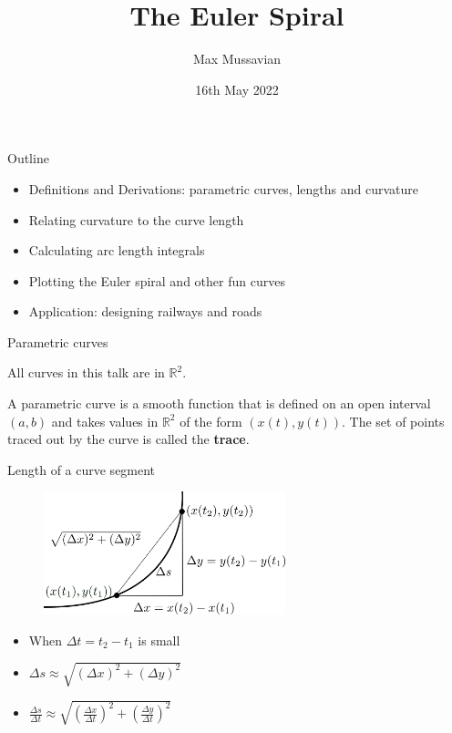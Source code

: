 \documentclass{beamer}
\title{The Euler Spiral}
\author{Max Mussavian}
\date[2022]{16th May 2022}
\begin{document}
\begin{frame}[plain]
    \maketitle
\end{frame}
\begin{frame}{Outline}
	\begin{itemize}
		\item Definitions and Derivations: parametric curves, lengths and curvature
		\item Relating curvature to the curve length
		\item Calculating arc length integrals
		\item Plotting the Euler spiral and other fun curves
		\item Application: designing railways and roads
	\end{itemize}
\end{frame}


\begin{frame}{Parametric curves}
	
		All curves in this talk are in $\mathbb{R}^2$.
		\begin{definition}
			A parametric curve is a smooth function that is defined on an open interval $(a, b)$ and takes values in $\mathbb{R}^2$ of the form $(x(t), y(t))$.
			\newline
			The set of points traced out by the curve is called the \textbf{trace}.
		\end{definition}
\end{frame}

\begin{frame}{Length of a curve segment}
	\begin{figure}
		\centering
		\includegraphics[width=70mm, scale=0.2]{curve_length_2.png}
	\end{figure}
	\begin{itemize}
		\item When $\Delta t = t_2 - t_1$ is small
		\item $\Delta s \approx	\sqrt{\left(\Delta x\right)^2 + \left(\Delta y\right)^2} $
		\item $\frac{\Delta s}{\Delta t} \approx	\sqrt{\left(\frac{\Delta x}{\Delta t}\right)^2 + \left(\frac{\Delta y}{\Delta t}\right)^2 } $
	\end{itemize}
\end{frame}
\end{document}
